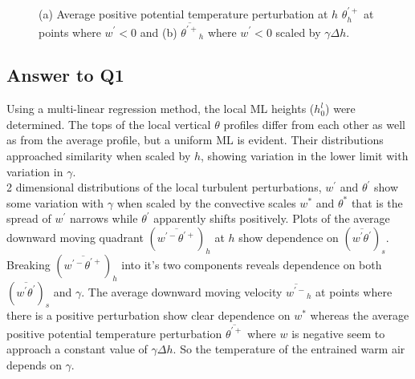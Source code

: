 \begin{figure}[htbp]
\begin{minipage}[b]{0.5\linewidth}
        \\
        \end{minipage}             
\quad
\begin{minipage}[b]{0.5\linewidth}
        \\      
       \end{minipage}
        \caption[Positive potential temperature perturbation at $h$ (ii)]{(a) Average positive potential temperature perturbation at $h$ $\theta^{\prime+}_{h}$ at points where $w^{\prime}<0$ and (b) $\overline{\theta^{\prime+}}_{h}$ where $w^{\prime}<0$ scaled by $\gamma \Delta h$.}
        \label{fig:downwarm_theta1}
\end{figure}

\subsection{Answer to Q1}

Using a multi-linear regression method, the local \acs{ML} heights ($h^{l}_{0}$) 
were determined.  The tops of the local vertical $\theta$ profiles differ from each other as well 
as from the average profile, but a uniform \acs{ML} is evident. 
Their distributions approached similarity when scaled by $h$, showing variation in the lower 
limit with variation in $\gamma$.\\

2 dimensional distributions of the local turbulent perturbations,
$w^{'}$ and $\theta^{'}$ show some variation with $\gamma$ when scaled by the convective scales $w^{*}$ and $\theta^{*}$
that is the spread of $w^{'}$ narrows while $\theta^{'}$ apparently shifts positively.  Plots of the
average downward moving quadrant $(\overline{w^{'-}\theta^{'+}})_{h}$ at $h$ show dependence on $(\overline{w^{'}\theta^{'}})_{s}$.
Breaking $(\overline{w^{'-}\theta^{'+}})_{h}$ into it's two components reveals dependence on both $(\overline{w^{'}\theta^{'}})_{s}$
and $\gamma$. The average downward moving velocity $\overline{w^{'-}}_{h}$ at points where there is a positive perturbation
show clear dependence on $w^{*}$ whereas the average positive potential temperature perturbation $\overline{\theta^{'+}}$ where 
$w$ is negative seem to approach a constant value of $\gamma \Delta h$. So the temperature of the entrained warm air 
depends on $\gamma$.

